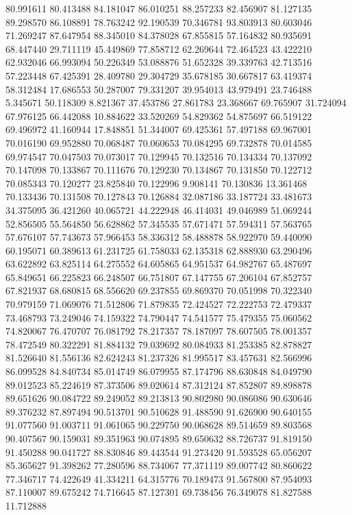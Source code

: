 80.991611
80.413488
84.181047
86.010251
88.257233
82.456907
81.127135
89.298570
86.108891
78.763242
92.190539
70.346781
93.803913
80.603046
71.269247
87.647954
88.345010
84.378028
67.855815
57.164832
80.935691
68.447440
29.711119
45.449869
77.858712
62.269644
72.464523
43.422210
62.932046
66.993094
50.226349
53.088876
51.652328
39.339763
42.713516
57.223448
67.425391
28.409780
29.304729
35.678185
30.667817
63.419374
58.312484
17.686553
50.287007
79.331207
39.954013
43.979491
23.746488
5.345671
50.118309
8.821367
37.453786
27.861783
23.368667
69.765907
31.724094
67.976125
66.442088
10.884622
33.520269
54.829362
54.875697
66.519122
69.496972
41.160944
17.848851
51.344007
69.425361
57.497188
69.967001
70.016190
69.952880
70.068487
70.060653
70.084295
69.732878
70.014585
69.974547
70.047503
70.073017
70.129945
70.132516
70.134334
70.137092
70.147098
70.133867
70.111676
70.129230
70.134867
70.131850
70.122712
70.085343
70.120277
23.825840
70.122996
9.908141
70.130836
13.361468
70.133436
70.131508
70.127843
70.126884
32.087186
33.187724
33.481673
34.375095
36.421260
40.065721
44.222948
46.414031
49.046989
51.069244
52.856505
55.564850
56.628862
57.345535
57.671471
57.594311
57.563765
57.676107
57.743673
57.966453
58.336312
58.488878
58.922970
59.440090
60.195071
60.389613
61.231725
61.758033
62.135318
62.888930
63.290496
63.622892
63.825114
64.275552
64.605865
64.951537
64.982767
65.487697
65.849651
66.225823
66.248507
66.751807
67.147755
67.206104
67.852757
67.821937
68.680815
68.556620
69.237855
69.869370
70.051998
70.322340
70.979159
71.069076
71.512806
71.879835
72.424527
72.222753
72.479337
73.468793
73.249046
74.159322
74.790447
74.541577
75.479355
75.060562
74.820067
76.470707
76.081792
78.217357
78.187097
78.607505
78.001357
78.472549
80.322291
81.884132
79.039692
80.084933
81.253385
82.878827
81.526640
81.556136
82.624243
81.237326
81.995517
83.457631
82.566996
86.099528
84.840734
85.014749
86.079955
87.174796
88.630848
84.049790
89.012523
85.224619
87.373506
89.020614
87.312124
87.852807
89.898878
89.651626
90.084722
89.249052
89.213813
90.802980
90.086086
90.630646
89.376232
87.897494
90.513701
90.510628
91.488590
91.626900
90.640155
91.077560
91.003711
91.061065
90.229750
90.068628
89.514659
89.803568
90.407567
90.159031
89.351963
90.074895
89.650632
88.726737
91.819150
91.450288
90.041727
88.830846
89.443544
91.273420
91.593528
65.056207
85.365627
91.398262
77.280596
88.734067
77.371119
89.007742
80.860622
77.346717
74.422649
41.334211
64.315776
70.189473
91.567800
87.954093
87.110007
89.675242
74.716645
87.127301
69.738456
76.349078
81.827588
11.712888
